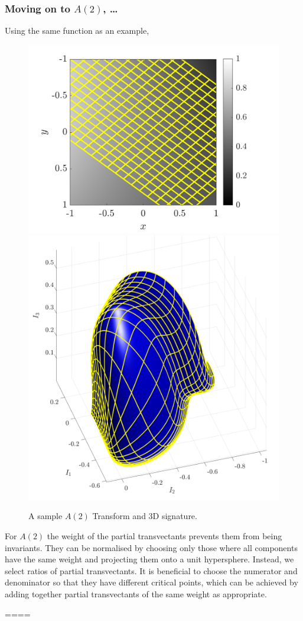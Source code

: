 \documentclass[review,onefignum,onetabnum]{siamonline190516}
\begin{document}
\subsubsection{Moving on to $A(2)$, \ldots}
Using the same function as an example, 
\begin{figure}
\centering
\includegraphics[width=.45\textwidth]{Figs/f_transformed_A2.png}
\includegraphics[width=.45\textwidth]{Figs/A2_signature.png}
\caption{A sample $A(2)$ Transform and 3D signature.}
\label{fig:A2}
\end{figure}

For $A(2)$ the weight of the partial transvectants prevents them from being invariants. They can be normalised by choosing only those where all components have the same weight and projecting them onto a unit hypersphere. Instead, we select ratios of partial transvectants. It is beneficial to choose the numerator and denominator so that they have different critical points, which can be achieved by adding together partial transvectants of the same weight as appropriate.

====
\end{document}
